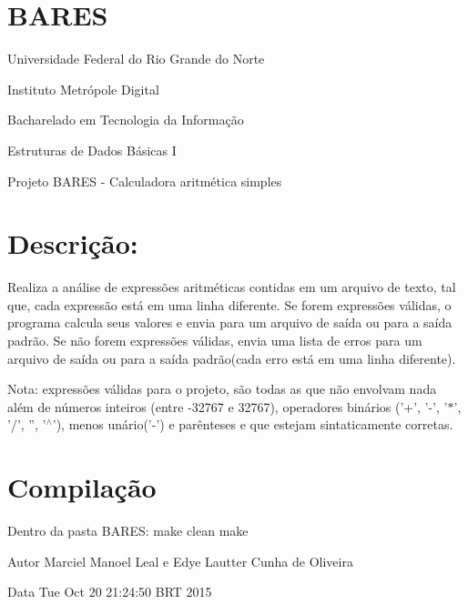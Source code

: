 \hypertarget{index_sec_header}{}\section{B\-A\-R\-E\-S}\label{index_sec_header}
Universidade Federal do Rio Grande do Norte \par
Instituto Metrópole Digital \par
Bacharelado em Tecnologia da Informação \par
Estruturas de Dados Básicas I \par
Projeto B\-A\-R\-E\-S -\/ Calculadora aritmética simples \par
 \hypertarget{index_sec_descripion}{}\section{Descrição\-:}\label{index_sec_descripion}
Realiza a análise de expressões aritméticas contidas em um arquivo de texto, tal que, cada expressão está em uma linha diferente. Se forem expressões válidas, o programa calcula seus valores e envia para um arquivo de saída ou para a saída padrão. Se não forem expressões válidas, envia uma lista de erros para um arquivo de saída ou para a saída padrão(cada erro está em uma linha diferente).

Nota\-: expressões válidas para o projeto, são todas as que não envolvam nada além de números inteiros (entre -\/32767 e 32767), operadores binários ('+', '-\/', '$\ast$', '/', '', '$^\wedge$'), menos unário('-\/') e parênteses e que estejam sintaticamente corretas.\hypertarget{index_sec_install}{}\section{Compilação}\label{index_sec_install}
Dentro da pasta B\-A\-R\-E\-S\-: make clean make

\begin{DoxyAuthor}{Autor}
Marciel Manoel Leal e Edye Lautter Cunha de Oliveira 
\end{DoxyAuthor}
\begin{DoxyDate}{Data}
Tue Oct 20 21\-:24\-:50 B\-R\-T 2015 
\end{DoxyDate}
